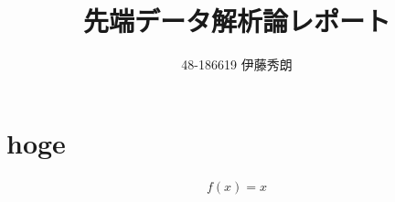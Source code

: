 \documentclass[onecolumn]{preport}
\title{先端データ解析論レポート}
\author{48-186619 伊藤秀朗}
\begin{document}
\pagestyle{empty}
\maketitle
\thispagestyle{empty}
\sloppy

\section{hoge}

\begin{align}
  f(x) = x
\end{align}

\end{document}
